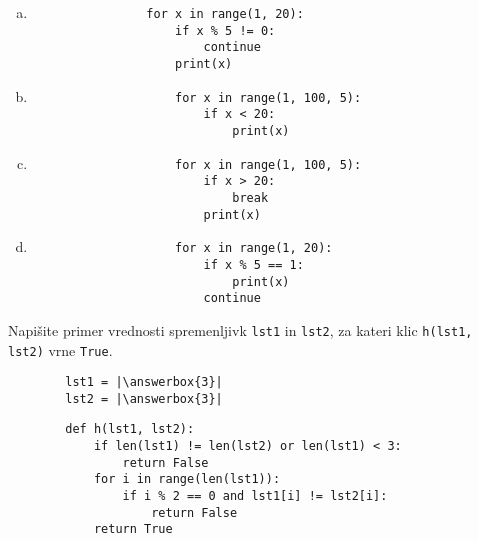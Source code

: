 \documentclass[arhiv, 10pt]{../izpit}
\newcommand{\inlinepy}[1]{\texttt{#1}}
\newcommand{\answerbox}[1]{\framebox{\vphantom{\large M}\hspace{#1cm}}}
\begin{document}
        \begin{multicols}{2}
        \begin{enumerate}[(a)]
\item 
            \begin{verbatim}
                for x in range(1, 20):
                    if x % 5 != 0:
                        continue
                    print(x)
            \end{verbatim}
        
\item 
                \begin{verbatim}
                    for x in range(1, 100, 5):
                        if x < 20:
                            print(x)
                \end{verbatim}
            
\item 
                \begin{verbatim}
                    for x in range(1, 100, 5):
                        if x > 20:
                            break
                        print(x)
                \end{verbatim}
            
\item 
                \begin{verbatim}
                    for x in range(1, 20):
                        if x % 5 == 1:
                            print(x)
                        continue
                \end{verbatim}
            
\end{enumerate}

        \end{multicols}
    
        \naloga*
        \begin{multicols}{2}
        \noindent
        Napišite primer vrednosti spremenljivk \inlinepy{lst1} in \inlinepy{lst2}, za kateri klic \inlinepy{h(lst1, lst2)} vrne \inlinepy{True}.
        \begin{verbatim}
        lst1 = |\answerbox{3}|
        lst2 = |\answerbox{3}|
        \end{verbatim}
        \vfil
        \columnbreak
        \begin{verbatim}
        def h(lst1, lst2):
            if len(lst1) != len(lst2) or len(lst1) < 3:
                return False
            for i in range(len(lst1)):
                if i % 2 == 0 and lst1[i] != lst2[i]:
                    return False
            return True
        \end{verbatim}
        \end{multicols}
    
\end{document}
